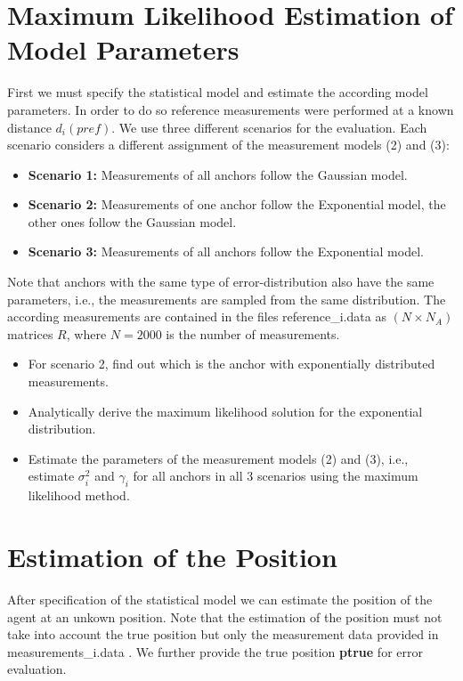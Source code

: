 \documentclass[a4paper]{article}
\begin{document}
\section{Maximum Likelihood Estimation of Model Parameters}

First we must specify the statistical model and estimate the according model parameters. In order to do so reference measurements were performed at a known distance $d_i(pref)$.
We use three different scenarios for the evaluation. Each scenario considers a different assignment of the measurement models (2) and (3):

\begin{itemize}[label={}]
  \item \textbf{Scenario 1:} Measurements of all anchors follow the Gaussian model.
  \item \textbf{Scenario 2:} Measurements of one anchor follow the Exponential model, the other ones follow the Gaussian model.
  \item \textbf{Scenario 3:} Measurements of all anchors follow the Exponential model.
\end{itemize}

Note that anchors with the same type of error-distribution also have the same parameters, i.e., the measurements are sampled from the same distribution.
The according measurements are contained in the files reference\_i.data as $(N × N_A)$ matrices $R$, where $N = 2000$ is the number of measurements.

\begin{itemize}[label={}]
  \item For scenario 2, find out which is the anchor with exponentially distributed measurements.
  \item Analytically derive the maximum likelihood solution for the exponential distribution.
  \item Estimate the parameters of the measurement models (2) and (3), i.e., estimate $\sigma^2_i$ and $\gamma_i$ for all anchors in all 3 scenarios using the maximum likelihood method.
\end{itemize}

\section{Estimation of the Position}
After specification of the statistical model we can estimate the position of the agent at an unkown position. Note that the estimation of the position must not take into account the true position but only the measurement data provided in measurements\_i.data . We further provide the true position \textbf{ptrue} for error evaluation.
\end{document}
